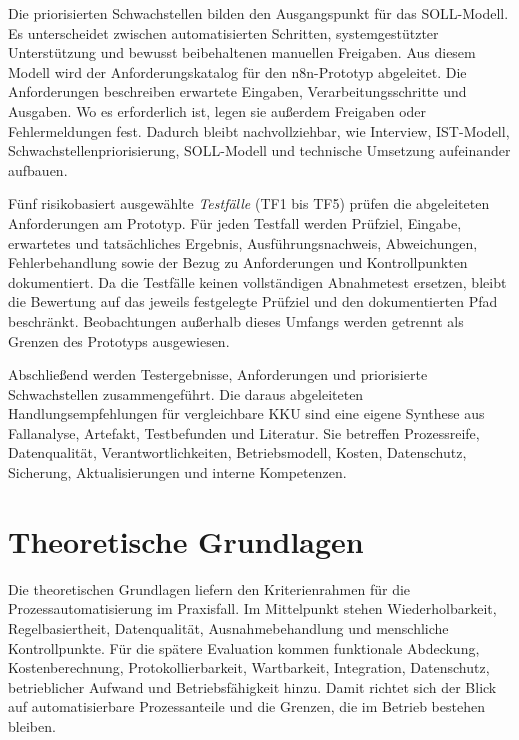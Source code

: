\documentclass[a4paper,12pt]{article}
\begin{document}
Die priorisierten Schwachstellen bilden den Ausgangspunkt für das SOLL-Modell. Es unterscheidet zwischen automatisierten Schritten, systemgestützter Unterstützung und bewusst beibehaltenen manuellen Freigaben. Aus diesem Modell wird der Anforderungskatalog für den n8n-Prototyp abgeleitet. Die Anforderungen beschreiben erwartete Eingaben, Verarbeitungsschritte und Ausgaben. Wo es erforderlich ist, legen sie außerdem Freigaben oder Fehlermeldungen fest. Dadurch bleibt nachvollziehbar, wie Interview, IST-Modell, Schwachstellenpriorisierung, SOLL-Modell und technische Umsetzung aufeinander aufbauen.

Fünf risikobasiert ausgewählte \textit{Testfälle} (TF1 bis TF5) prüfen die abgeleiteten Anforderungen am Prototyp. Für jeden Testfall werden Prüfziel, Eingabe, erwartetes und tatsächliches Ergebnis, Ausführungsnachweis, Abweichungen, Fehlerbehandlung sowie der Bezug zu Anforderungen und Kontrollpunkten dokumentiert. Da die Testfälle keinen vollständigen Abnahmetest ersetzen, bleibt die Bewertung auf das jeweils festgelegte Prüfziel und den dokumentierten Pfad beschränkt. Beobachtungen außerhalb dieses Umfangs werden getrennt als Grenzen des Prototyps ausgewiesen.

Abschließend werden Testergebnisse, Anforderungen und priorisierte Schwachstellen zusammengeführt. Die daraus abgeleiteten Handlungsempfehlungen für vergleichbare KKU sind eine eigene Synthese aus Fallanalyse, Artefakt, Testbefunden und Literatur. Sie betreffen Prozessreife, Datenqualität, Verantwortlichkeiten, Betriebsmodell, Kosten, Datenschutz, Sicherung, Aktualisierungen und interne Kompetenzen.

\clearpage
\section{Theoretische Grundlagen}
Die theoretischen Grundlagen liefern den Kriterienrahmen für die Prozessautomatisierung im Praxisfall. Im Mittelpunkt stehen Wiederholbarkeit, Regelbasiertheit, Datenqualität, Ausnahmebehandlung und menschliche Kontrollpunkte. Für die spätere Evaluation kommen funktionale Abdeckung, Kostenberechnung, Protokollierbarkeit, Wartbarkeit, Integration, Datenschutz, betrieblicher Aufwand und Betriebsfähigkeit hinzu. Damit richtet sich der Blick auf automatisierbare Prozessanteile und die Grenzen, die im Betrieb bestehen bleiben.
\end{document}
